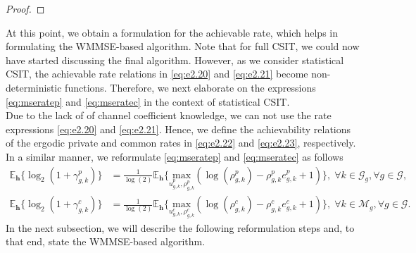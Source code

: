 \documentclass[12pt,draftcls,onecolumn]{IEEEtran}
\theoremstyle{remark}
\theoremstyle{definition}
\begin{document}
{\begin{proof}
\end{proof}
At this point, we obtain a formulation for the achievable rate, which helps in formulating the WMMSE-based algorithm. Note that for full CSIT, we could now have started discussing the final algorithm. However, as we consider statistical CSIT, the achievable rate relations in \eqref{eq:e2.20} and \eqref{eq:e2.21} become non-deterministic functions. Therefore, we next elaborate on the expressions \eqref{eq:mseratep} and \eqref{eq:mseratec} in the context of statistical CSIT. \\
\indent Due to the lack of of channel coefficient knowledge, we can not use the rate expressions \eqref{eq:e2.20} and \eqref{eq:e2.21}. Hence, we define the achievability relations of the ergodic private and common rates in \eqref{eq:e2.22} and \eqref{eq:e2.23}, respectively. In a similar manner, we reformulate \eqref{eq:mseratep} and \eqref{eq:mseratec} as follows
\begin{align}
	\mathds{E}_\mathbf{h}\{\log_2(1+\gamma_{g,k}^p)\} &= \frac{1}{\log(2)}\mathds{E}_\mathbf{h}\bigg\{\underset{u_{g,k}^p,\rho_{g,k}^p}{\text{max}} \left( \log(\rho_{g,k}^p)-\rho_{g,k}^p e_{g,k}^p + 1 \right)\bigg\}, \; \forall k \in \mathcal{G}_g, \forall g \in \mathcal{G}, \label{eq:wmmseratep}\\
	\mathds{E}_\mathbf{h}\{\log_2(1+\gamma_{g,k}^c)\} &= \frac{1}{\log(2)}\mathds{E}_\mathbf{h}\bigg\{\underset{u_{g,k}^c,\rho_{g,k}^c}{\text{max}} \left( \log(\rho_{g,k}^c)-\rho_{g,k}^c e_{g,k}^c + 1 \right) \bigg\} , \; \forall k \in \mathcal{M}_g, \forall g \in \mathcal{G} \label{eq:wmmseratec}.
\end{align}
In the next subsection, we will describe the following reformulation steps and, to that end, state the WMMSE-based algorithm.
}
\end{document}
